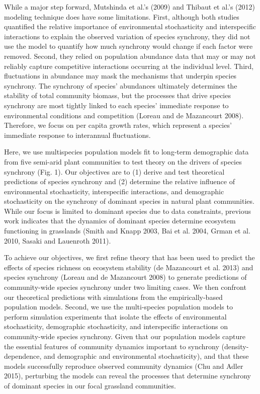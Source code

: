 \documentclass[12pt,]{article}
\begin{document}
While a major step forward, Mutshinda et al.'s (2009) and Thibaut et
al.'s (2012) modeling technique does have some limitations.
First, although both studies quantified the relative importance of environmental stochasticity and interspecific interactions to explain the observed variation of species synchrony, they did not use the model to quantify how much synchrony would change if each factor were removed.
Second, they relied on population abundance data that may or may not reliably capture competitive interactions occurring at the individual level.
Third, fluctuations in abundance may mask the mechanisms that underpin species synchrony.
The synchrony of species' abundances ultimately determines the stability of total community biomass, but the processes that drive species synchrony are most tightly linked to each species' immediate response to environmental conditions and competition
(Loreau and {{de Mazancourt}} 2008).
Therefore, we focus on per capita growth rates, which represent a species' immediate response to interannual fluctuations.

Here, we use multispecies population models fit to long-term demographic
data from five semi-arid plant communities to test theory on the drivers
of species synchrony (Fig. 1). Our objectives are to (1) derive and test
theoretical predictions of species synchrony and (2) determine the
relative influence of environmental stochasticity, interspecific
interactions, and demographic stochasticity on
the synchrony of dominant species in natural plant
communities.
While our focus is limited to dominant species due to data constraints, previous work indicates that the dynamics of dominant species determine ecosystem functioning in grasslands
(Smith and Knapp 2003, Bai et al. 2004, Grman et al. 2010, Sasaki and
Lauenroth 2011).

To achieve our objectives, we first refine theory that has been used to
predict the effects of species richness on ecosystem stability ({{de
Mazancourt}} et al. 2013) and species synchrony (Loreau and {{de
Mazancourt}} 2008) to generate predictions of community-wide species
synchrony under two limiting cases. We then confront our theoretical
predictions with simulations from the empirically-based population
models. Second, we use the multi-species population models to perform
simulation experiments that isolate the effects of environmental
stochasticity, demographic stochasticity, and interspecific interactions
on community-wide species synchrony. Given that our population models
capture the essential features of community dynamics important to
synchrony (density-dependence, and demographic and environmental
stochasticity), and that these models successfully reproduce observed
community dynamics (Chu and Adler 2015), perturbing the models can
reveal the processes that determine synchrony
of dominant species in our focal grassland
communities.
\end{document}
